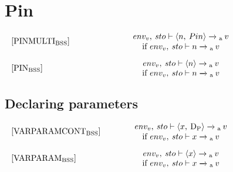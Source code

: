 \section{Pin}
\begin{equation}
\begin{minipage}{.2\linewidth}
$[\text{PINMULTI}_\text{BSS}]$
\end{minipage}
\\
\begin{minipage}{.8\linewidth}
\centering
$env_v, \: sto \vdash \langle n, \: Pin \rangle \xrightarrow{}\textsubscript{a} \: v $
\\if $env_v, \: sto \vdash n \xrightarrow{} \textsubscript{a} \: v$
\end{minipage}
\end{equation}

\begin{equation}
\begin{minipage}{.2\linewidth}
$[\text{PIN}_\text{BSS}]$
\end{minipage}
\\
\begin{minipage}{.8\linewidth}
\centering
$env_v, \: sto \vdash \langle n \rangle \xrightarrow{}\textsubscript{a} \: v $
\\if $env_v, \: sto \vdash n \xrightarrow{} \textsubscript{a} \: v$
\end{minipage}
\end{equation}

\subsection*{Declaring parameters}
\begin{equation}
\begin{minipage}{.2\linewidth}
$[\text{VARPARAMCONT}_\text{BSS}]$
\end{minipage}
\\
\begin{minipage}{.8\linewidth}
\centering
$env_v, \: sto \vdash \langle x, \: \text{D\textsubscript{P}} \rangle \xrightarrow{}\textsubscript{a} \: v $
\\
if $env_v, \: sto \vdash x \xrightarrow{} \textsubscript{a} \: v$
\end{minipage}
\end{equation}

\begin{equation}
\begin{minipage}{.2\linewidth}
$[\text{VARPARAM}_\text{BSS}]$
\end{minipage}
\\
\begin{minipage}{.8\linewidth}
\centering
$env_v, \: sto \vdash \langle x \rangle \xrightarrow{}\textsubscript{a} \: v $
\\
if $env_v, \: sto \vdash x \xrightarrow{} \textsubscript{a} \: v$
\end{minipage}
\end{equation}

